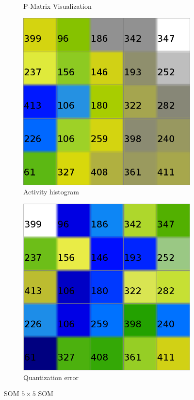 \documentclass{acm_proc_article-sp}
\begin{document}
\begin{figure}
\begin{subfigure}[b]{0.45\linewidth}
    \caption{P-Matrix Visualization}
    \label{fig:wine-small-p-matrix}
\end{subfigure}
\begin{subfigure}[b]{0.45\linewidth}
    \includegraphics[width=\linewidth]{img/wine-small-activity-histogram}
    \caption{Activity histogram}
    \label{fig:wine-small-activity-histogram}
\end{subfigure}
\begin{subfigure}[b]{0.45\linewidth}
    \includegraphics[width=\linewidth]{img/wine-small-quant-error}
    \caption{Quantization error}
    \label{fig:wine-small-quant-error}
\end{subfigure}
    \caption{SOM $5\times5$ SOM}
\end{figure}
\end{document}
